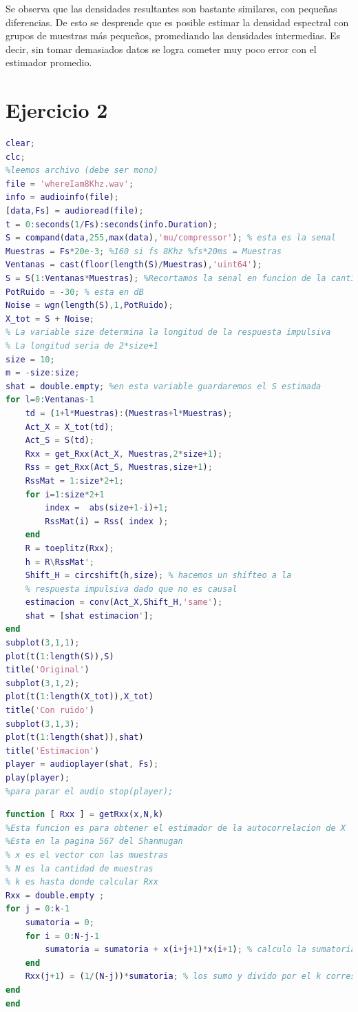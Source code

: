 Se observa que las densidades resultantes son bastante similares, con pequeñas diferencias. De esto se desprende que es posible estimar la densidad espectral con grupos de muestras más pequeños, promediando las densidades intermedias. Es decir, sin tomar demasiados datos se logra cometer muy poco error con el estimador promedio.

\newpage
\section*{Ejercicio 2}

\begin{lstlisting}[language=Matlab, caption=Ejercicio2.m]
clear;
clc;
%leemos archivo (debe ser mono)
file = 'whereIam8Khz.wav';
info = audioinfo(file);
[data,Fs] = audioread(file);
t = 0:seconds(1/Fs):seconds(info.Duration);
S = compand(data,255,max(data),'mu/compressor'); % esta es la senal
Muestras = Fs*20e-3; %160 si fs 8Khz %fs*20ms = Muestras
Ventanas = cast(floor(length(S)/Muestras),'uint64'); 
S = S(1:Ventanas*Muestras); %Recortamos la senal en funcion de la cantidad de ventanas
PotRuido = -30; % esta en dB
Noise = wgn(length(S),1,PotRuido);
X_tot = S + Noise;
% La variable size determina la longitud de la respuesta impulsiva
% La longitud seria de 2*size+1
size = 10;
m = -size:size;
shat = double.empty; %en esta variable guardaremos el S estimada
for l=0:Ventanas-1
    td = (1+l*Muestras):(Muestras+l*Muestras);
    Act_X = X_tot(td);    
    Act_S = S(td);
    Rxx = get_Rxx(Act_X, Muestras,2*size+1);
    Rss = get_Rxx(Act_S, Muestras,size+1);
    RssMat = 1:size*2+1;
    for i=1:size*2+1
        index =  abs(size+1-i)+1;
        RssMat(i) = Rss( index );
    end
    R = toeplitz(Rxx);
    h = R\RssMat';
    Shift_H = circshift(h,size); % hacemos un shifteo a la 
    % respuesta impulsiva dado que no es causal
    estimacion = conv(Act_X,Shift_H,'same');        
    shat = [shat estimacion'];
end
subplot(3,1,1);
plot(t(1:length(S)),S)
title('Original')
subplot(3,1,2);
plot(t(1:length(X_tot)),X_tot)
title('Con ruido')
subplot(3,1,3);
plot(t(1:length(shat)),shat)
title('Estimacion')
player = audioplayer(shat, Fs);
play(player);
%para parar el audio stop(player);
\end{lstlisting}

\begin{lstlisting}[language=Matlab, caption=getRxx.m]
function [ Rxx ] = getRxx(x,N,k)
%Esta funcion es para obtener el estimador de la autocorrelacion de X
%Esta en la pagina 567 del Shanmugan
% x es el vector con las muestras
% N es la cantidad de muestras
% k es hasta donde calcular Rxx
Rxx = double.empty ;
for j = 0:k-1
    sumatoria = 0;
    for i = 0:N-j-1
        sumatoria = sumatoria + x(i+j+1)*x(i+1); % calculo la sumatoria
    end
    Rxx(j+1) = (1/(N-j))*sumatoria; % los sumo y divido por el k correspondiente
end
end

\end{lstlisting}


